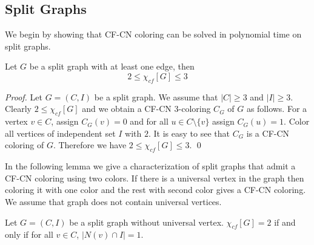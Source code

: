 \documentclass[svgnames]{llncs}
\newcommand{\cfcn}{\textsc {CF-CN}}
\begin{document}
\subsection{Split Graphs}
We begin by showing that \cfcn{} coloring can be solved in polynomial time on split graphs. 
\begin{lemma}\label{lem-cfcn-upper}
Let $G$ be a split graph with at least one edge, then $$2 \leq \chi_{cf}[G] \leq 3$$ 
\end{lemma}
\begin{proof}
Let $G=(C,I)$ be a split graph. We assume that $|C| \geq 3$ and $|I| \geq 3$. Clearly $2 \leq \chi_{cf}[G]$ and we obtain a \cfcn{} 3-coloring $C_G$ of $G$ as follows. 
For a vertex $v \in C$,  assign $C_G(v)=0$ and for all $u \in C \setminus \{v\}$ assign $C_G(u)=1$.
Color all vertices of independent set $I$ with $2$. It is easy to see  that $C_G$ is a \cfcn{} coloring of $G$.
Therefore we have $2 \leq \chi_{cf}[G] \leq 3$. \qed
\end{proof}
In the following lemma we give a characterization of split graphs that admit a \cfcn{} coloring using two colors.
If there is a universal vertex in the graph then coloring it with one color and the rest with second color gives a \cfcn{} coloring.
We assume that graph does not contain universal vertices. 
\begin{lemma}\label{lem-cfcn-split}
 Let $G=(C,I)$ be a split graph without universal vertex. $\chi_{cf}[G]=2$ if and only if for all $v \in C$, $|N(v) \cap I|=1$.
\end{lemma}
\end{document}
